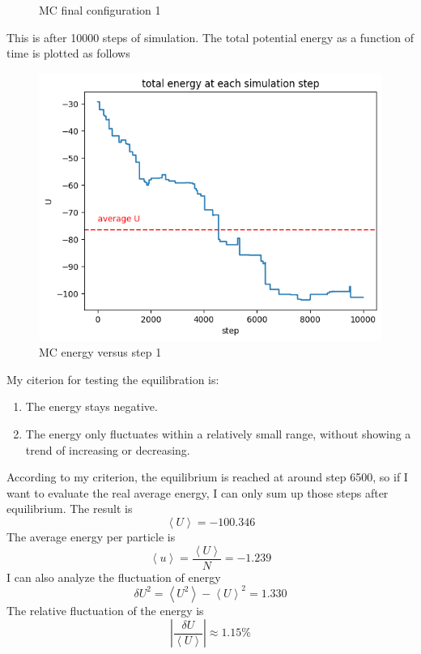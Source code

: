 \documentclass[letterpaper,12pt]{article}
\numberwithin{equation}{section}
\begin{document}
\begin{enumerate}[label=(\alph*)]
\begin{figure}[H]
        \caption{MC final configuration 1}
    \end{figure}
    This is after 10000 steps of simulation. The total potential energy as a function of time is plotted as follows
    \begin{figure}[H]
        \centering
        \includegraphics[width=.8\textwidth]{energy_to_time_mc1.png}
        \caption{MC energy versus step 1}
    \end{figure}
    My citerion for testing the equilibration is:
    \begin{enumerate}[label=\textbullet]
        \item The energy stays negative.
        \item The energy only fluctuates within a relatively small range, without showing a trend of increasing or decreasing.
    \end{enumerate}
    According to my criterion, the equilibrium is reached at around step 6500, so if I want to evaluate the real average energy, I can only sum up those steps after equilibrium. The result is 
    \begin{equation}
        \left \langle U\right\rangle=-100.346
    \end{equation}
    The average energy per particle is 
    \begin{equation}
        \left\langle u\right\rangle=\frac{\left \langle U\right\rangle}{N}=-1.239
    \end{equation}
    I can also analyze the fluctuation of energy
    \begin{equation}
        \delta U^2=\left \langle U^2\right\rangle-\left \langle U\right\rangle^2=1.330
    \end{equation}
    The relative fluctuation of the energy is
    \begin{equation}
        \label{Eq:r_fluc_mc1}
        \left| \frac{\delta U}{\left \langle U\right\rangle} \right|\approx 1.15\%
    \end{equation} 


\end{enumerate}
\end{document}
